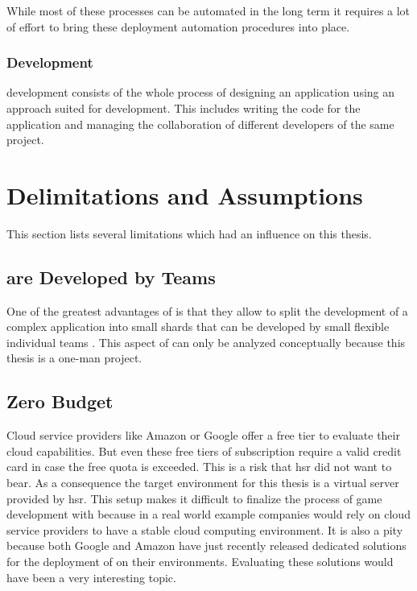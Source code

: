 While most of these processes can be automated in the long term it requires a
lot of effort to bring these deployment automation procedures into place.

\subsubsection{\msuc{} Development}

\msuc{} development consists of the whole process of designing an application
using an approach suited for \ms{} development. This includes writing the code
for the application and managing the collaboration of different developers of
the same project.

\section{Delimitations and Assumptions}

This section lists several limitations which had an influence on this
thesis.

\subsection{\mssuc{} are Developed by Teams}
One of the greatest advantages of \mss{} is that they allow to split the
development of a complex application into small shards that can be developed by
small flexible individual teams \cite{anderson2017teams}. This aspect of \mss{}
can only be analyzed conceptually because this thesis is a one-man project.

\subsection{Zero Budget}
\label{sub:zero_buget}
Cloud service providers like Amazon or Google offer a free tier to evaluate
their cloud capabilities. But even these free tiers of subscription require a
valid credit card in case the free quota is exceeded. This is a risk that
\gls{hsr} did not want to bear. As a consequence the target environment for this
thesis is a virtual server provided by \gls{hsr}. This setup makes it difficult
to finalize the process of game development with \mss{} because in a real world
example companies would rely on cloud service providers to have a stable cloud
computing environment. It is also a pity because both Google and Amazon have
just recently released dedicated solutions for the deployment of \ogs{} on their
environments. Evaluating these solutions would have been a very interesting
topic.

